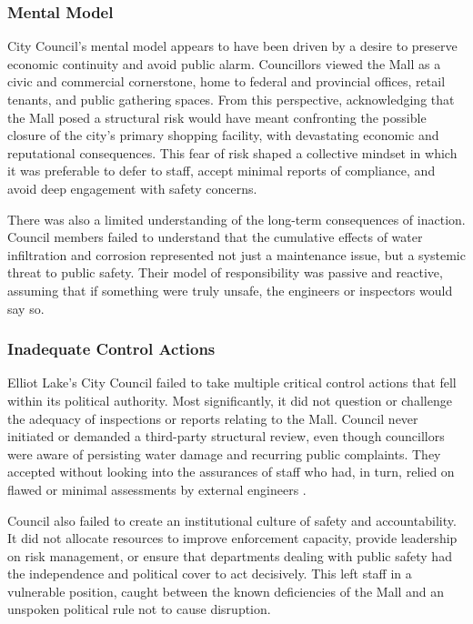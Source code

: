 \documentclass[12pt]{article}
\begin{document}
\subsubsection*{Mental Model}

City Council's mental model appears to have been driven by a desire to preserve economic continuity and avoid public alarm. Councillors viewed the Mall as a civic and commercial cornerstone, home to federal and provincial offices, retail tenants, and public gathering spaces. From this perspective, acknowledging that the Mall posed a structural risk would have meant confronting the possible closure of the city's primary shopping facility, with devastating economic and reputational consequences. This fear of risk shaped a collective mindset in which it was preferable to defer to staff, accept minimal reports of compliance, and avoid deep engagement with safety concerns.

There was also a limited understanding of the long-term consequences of inaction. Council members failed to understand that the cumulative effects of water infiltration and corrosion represented not just a maintenance issue, but a systemic threat to public safety. Their model of responsibility was passive and reactive, assuming that if something were truly unsafe, the engineers or inspectors would say so.

\subsubsection*{Inadequate Control Actions}

Elliot Lake's City Council failed to take multiple critical control actions that fell within its political authority. Most significantly, it did not question or challenge the adequacy of inspections or reports relating to the Mall. Council never initiated or demanded a third-party structural review, even though councillors were aware of persisting water damage and recurring public complaints. They accepted without looking into the assurances of staff who had, in turn, relied on flawed or minimal assessments by external engineers \cite[p375-377]{AlgoLakeReport1}.

Council also failed to create an institutional culture of safety and accountability. It did not allocate resources to improve enforcement capacity, provide leadership on risk management, or ensure that departments dealing with public safety had the independence and political cover to act decisively. This left staff in a vulnerable position, caught between the known deficiencies of the Mall and an unspoken political rule not to cause disruption.
\end{document}
